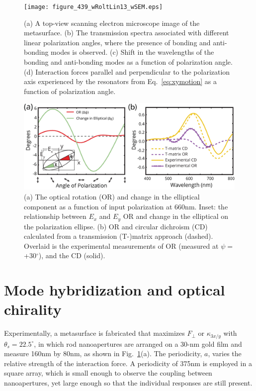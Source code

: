 \begin{figure}[b!]
\centering
\texttt{[image: figure\_439\_wRoltLin13\_wSEM.eps]} 
\caption{(a) A top-view scanning electron microscope image of the metasurface. (b) The transmission spectra associated with different linear polarization angles, where the presence of bonding and anti-bonding modes is observed. (c) Shift in the wavelengths of the bonding and anti-bonding modes as a function of polarization angle. (d) Interaction forces parallel and perpendicular to the polarization axis experienced by the resonators from Eq.~\ref{eq:xymotion} as a function of polarization angle.} 
\label{fig:rotlin}
\end{figure}

\begin{figure}[b!]
\centering
\includegraphics[width=\linewidth]{exp-OR-CD_varyPol4.eps}
\caption{(a) The optical rotation (OR) and change in the elliptical component as a function of input polarization at 660nm. Inset: the relationship between $E_x$ and $E_y$ OR and change in the elliptical on the polarization ellipse. (b) OR and circular dichroism (CD) calculated from a transmission (T-)matrix approach (dashed). Overlaid is the experimental measurements of OR (measured at $\psi=$+30$^\circ$), and the CD (solid).} 
\label{fig:CD-OR}
\end{figure} 
\section{Mode hybridization and optical chirality}
Experimentally, a metasurface is fabricated that maximizes $F_\perp$ or $\kappa_{3x/y}$ with $\theta_s = 22.5^\circ$, %
in which rod nanoapertures are arranged on a 30-nm gold film and measure 160nm by 80nm, as shown in Fig.~\ref{fig:rotlin}(a). The periodicity, $a$, varies the relative strength of the interaction force.
A periodicity of 375nm is employed in a square array, which is small enough to observe the coupling between nanoapertures, yet large enough so that the individual responses are still present.   

